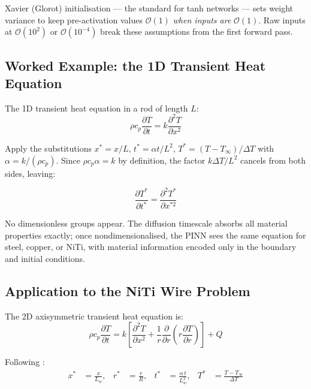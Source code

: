 \documentclass[12pt, a4paper]{article}
\begin{document}
Xavier (Glorot) initialisation — the standard for tanh networks — sets weight
variance to keep pre-activation values $\mathcal{O}(1)$ \emph{when inputs are}
$\mathcal{O}(1)$. Raw inputs at $\mathcal{O}(10^2)$ or $\mathcal{O}(10^{-4})$
break these assumptions from the first forward pass.

\subsection{Worked Example: the 1D Transient Heat Equation}
\label{sec:nondim_example}

The 1D transient heat equation in a rod of length $L$:
\begin{equation}
    \rho c_p \frac{\partial T}{\partial t}
    = k \frac{\partial^2 T}{\partial x^2}
    \label{eq:heat1d_dim}
\end{equation}

Apply the substitutions $x^* = x/L$, $t^* = \alpha t/L^2$,
$T^* = (T-T_\infty)/\Delta T$ with $\alpha = k/(\rho c_p)$. Since
$\rho c_p \alpha = k$ by definition, the factor $k\Delta T/L^2$ cancels from
both sides, leaving:

\begin{equation}
    \boxed{
    \frac{\partial T^*}{\partial t^*}
    = \frac{\partial^2 T^*}{\partial x^{*2}}
    }
    \label{eq:heat1d_nondim}
\end{equation}

No dimensionless groups appear. The diffusion timescale absorbs all material
properties exactly; once nondimensionalised, the PINN sees the same equation
for steel, copper, or NiTi, with material information encoded only in the
boundary and initial conditions.

\subsection{Application to the NiTi Wire Problem}
\label{sec:nondim_niti}

The 2D axisymmetric transient heat equation is:
\begin{equation}
    \rho c_p \frac{\partial T}{\partial t}
    = k \left[
        \frac{\partial^2 T}{\partial x^2}
        + \frac{1}{r}\frac{\partial}{\partial r}
          \!\left(r\frac{\partial T}{\partial r}\right)
    \right] + Q
    \label{eq:heat2d_dim}
\end{equation}

Following \citet{cai2021}:
\begin{align}
    x^* &= \frac{x}{L_w}, &
    r^* &= \frac{r}{R},   &
    t^* &= \frac{\alpha\, t}{L_w^2}, &
    T^* &= \frac{T - T_\infty}{\Delta T}
    \label{eq:nondim_niti_vars}
\end{align}
\end{document}
